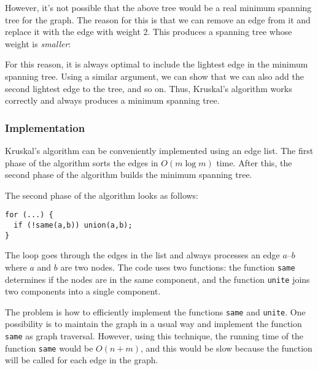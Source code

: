 However, it's not possible that the above tree
would be a real minimum spanning tree for the graph.
The reason for this is that we can remove an edge
from it and replace it with the edge with weight 2.
This produces a spanning tree whose weight is
\emph{smaller}:

\begin{center}
\end{center}

For this reason, it is always optimal to include the lightest edge
in the minimum spanning tree.
Using a similar argument, we can show that we
can also add the second lightest edge to the tree, and so on.
Thus, Kruskal's algorithm works correctly and
always produces a minimum spanning tree.

\subsubsection{Implementation}

Kruskal's algorithm can be conveniently
implemented using an edge list.
The first phase of the algorithm sorts the
edges in $O(m \log m)$ time.
After this, the second phase of the algorithm
builds the minimum spanning tree. 

The second phase of the algorithm looks as follows:

\begin{lstlisting}
for (...) {
  if (!same(a,b)) union(a,b);
}
\end{lstlisting}

The loop goes through the edges in the list
and always processes an edge $a$--$b$
where $a$ and $b$ are two nodes.
The code uses two functions:
the function \texttt{same} determines
if the nodes are in the same component,
and the function \texttt{unite}
joins two components into a single component.

The problem is how to efficiently implement
the functions \texttt{same} and \texttt{unite}.
One possibility is to maintain the graph
in a usual way and implement the function
\texttt{same} as graph traversal.
However, using this technique,
the running time of the function \texttt{same} would be $O(n+m)$,
and this would be slow because the function will be
called for each edge in the graph.

